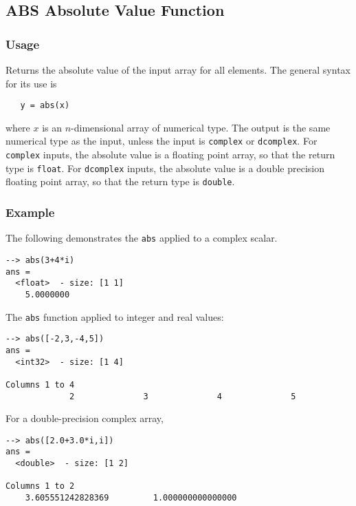 %
%
%
\subsection{ABS Absolute Value Function}
\subsubsection{Usage}
Returns the absolute value of the input array for all elements.  The 
general syntax for its use is
\begin{verbatim}
   y = abs(x)
\end{verbatim}
where $x$ is an $n$-dimensional array of numerical type.  The output 
is the same numerical type as the input, unless the input is \verb|complex|
or \verb|dcomplex|.  For \verb|complex| inputs, the absolute value is a floating
point array, so that the return type is \verb|float|.  For \verb|dcomplex|
inputs, the absolute value is a double precision floating point array, so that
the return type is \verb|double|.
\subsubsection{Example}
The following demonstrates the \verb|abs| applied to a complex scalar.
\begin{verbatim}
--> abs(3+4*i)
ans =
  <float>  - size: [1 1]
    5.0000000
\end{verbatim}
The \verb|abs| function applied to integer and real values:
\begin{verbatim}
--> abs([-2,3,-4,5])
ans =
  <int32>  - size: [1 4]
  
Columns 1 to 4
             2              3              4              5
\end{verbatim}
For a double-precision complex array,
\begin{verbatim}
--> abs([2.0+3.0*i,i])
ans =
  <double>  - size: [1 2]
  
Columns 1 to 2
    3.605551242828369         1.000000000000000
\end{verbatim}
